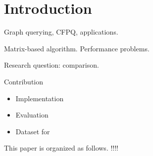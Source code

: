 \section{Introduction}

Graph querying, CFPQ, applications.

Matrix-based algorithm. Performance problems.

Research question: comparison.

Contribution
\begin{itemize}
\item Implementation
\item Evaluation
\item Dataset for
\end{itemize}

This paper is organized as follows. !!!!

